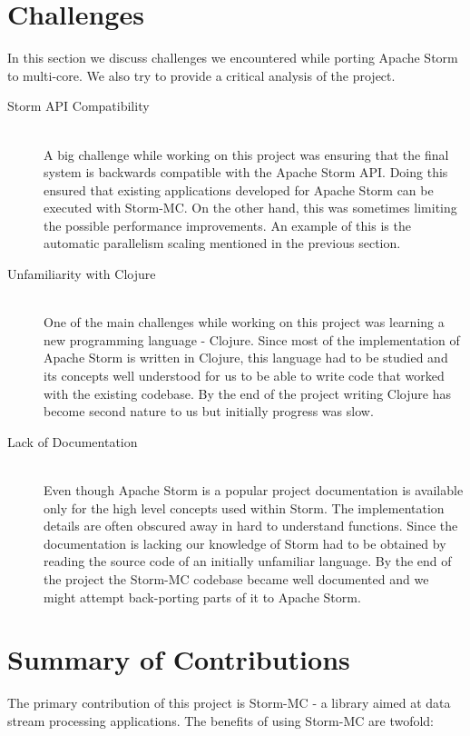 \documentclass[bsc,deptreport,twoside,singlespacing,normalheadings,parskip]{infthesis}\usepackage[]{graphicx}\usepackage[]{color}
\begin{document}
\section{Challenges}
\label{sec:challenges}

In this section we discuss challenges we encountered while porting Apache Storm to multi-core. We also try to provide a critical analysis of the project.

\begin{description}
	\item[Storm API Compatibility] \hfill \\
	A big challenge while working on this project was ensuring that the final system is backwards compatible with the Apache Storm API. Doing this ensured that existing applications developed for Apache Storm can be executed with Storm-MC. On the other hand, this was sometimes limiting the possible performance improvements. An example of this is the automatic parallelism scaling mentioned in the previous section.
	\item[Unfamiliarity with Clojure] \hfill \\
	One of the main challenges while working on this project was learning a new programming language - Clojure. Since most of the implementation of Apache Storm is written in Clojure, this language had to be studied and its concepts well understood for us to be able to write code that worked with the existing codebase. By the end of the project writing Clojure has become second nature to us but initially progress was slow.
	\item[Lack of Documentation] \hfill \\
	Even though Apache Storm is a popular project documentation is available only for the high level concepts used within Storm. The implementation details are often obscured away in hard to understand functions. Since the documentation is lacking our knowledge of Storm had to be obtained by reading the source code of an initially unfamiliar language. By the end of the project the Storm-MC codebase became well documented and we might attempt back-porting parts of it to Apache Storm.
\end{description}

\section{Summary of Contributions}
\label{sec:contribs}

The primary contribution of this project is Storm-MC - a library aimed at data stream processing applications. The benefits of using Storm-MC are twofold:
\end{document}
